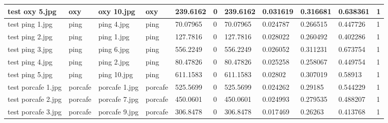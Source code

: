 \begin{landscape}
\begin{longtable}{|p{2cm}|p{1.5cm}|p{2cm}|p{1.5cm}|p{2cm}|p{1cm}|p{2cm}|p{2cm}|p{2cm}|p{2cm}|p{1cm}|}
		test oxy 5.jpg       & oxy              & oxy 10.jpg            & oxy                         & 239.6162              & 0                       & 239.6162                   & 0.031619              & 0.316681              & 0.638361                 & 1                \\ \hline
		test ping 1.jpg      & ping             & ping 4.jpg            & ping                        & 70.07965              & 0                       & 70.07965                   & 0.024787              & 0.266515              & 0.447726                 & 1                \\ \hline
		test ping 2.jpg      & ping             & ping 1.jpg            & ping                        & 127.7816              & 0                       & 127.7816                   & 0.028022              & 0.260492              & 0.402286                 & 1                \\ \hline
		test ping 3.jpg      & ping             & ping 6.jpg            & ping                        & 556.2249              & 0                       & 556.2249                   & 0.026052              & 0.311231              & 0.673754                 & 1                \\ \hline
		test ping 4.jpg      & ping             & ping 2.jpg            & ping                        & 80.47826              & 0                       & 80.47826                   & 0.025258              & 0.258067              & 0.449754                 & 1                \\ \hline
		test ping 5.jpg      & ping             & ping 10.jpg           & ping                        & 611.1583              & 0                       & 611.1583                   & 0.02802               & 0.307019              & 0.58913                  & 1                \\ \hline
		test porcafe 1.jpg   & porcafe          & porcafe 1.jpg         & porcafe                     & 525.5699              & 0                       & 525.5699                   & 0.024262              & 0.29185               & 0.544229                 & 1                \\ \hline
		test porcafe 2.jpg   & porcafe          & porcafe 7.jpg         & porcafe                     & 450.0601              & 0                       & 450.0601                   & 0.024993              & 0.279535              & 0.488207                 & 1                \\ \hline
		test porcafe 3.jpg   & porcafe          & porcafe 9.jpg         & porcafe                     & 306.8478              & 0                       & 306.8478                   & 0.017469              & 0.26263               & 0.413768                 & 1                \\ \hline

\end{longtable}
\end{landscape}
